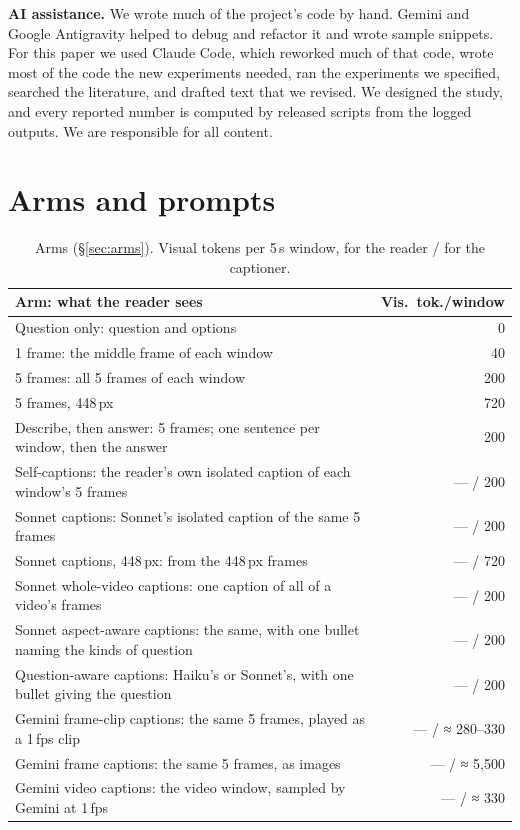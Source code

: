 \documentclass[11pt]{article}
\begin{document}
\textbf{AI assistance.} We wrote much of the project's code by hand. Gemini and Google Antigravity helped to debug and refactor it and wrote sample snippets. For this paper we used Claude Code, which reworked much of that code, wrote most of the code the new experiments needed, ran the experiments we specified, searched the literature, and drafted text that we revised. We designed the study, and every reported number is computed by released scripts from the logged outputs. We are responsible for all content.



\appendix

\section{Arms and prompts}
\label{app:prompts}

\begin{table}[t]
\centering
\footnotesize
\setlength{\tabcolsep}{3pt}
\begin{tabular}{@{}p{}r@{}}
\toprule
Arm: what the reader sees & Vis.\ tok./window \\
\midrule
Question only: question and options & 0 \\
1 frame: the middle frame of each window & 40 \\
5 frames: all 5 frames of each window & 200 \\
5 frames, 448\,px & 720 \\
Describe, then answer: 5 frames; one sentence per window, then the answer & 200 \\
\midrule
Self-captions: the reader's own isolated caption of each window's 5 frames & — / 200 \\
Sonnet captions: Sonnet's isolated caption of the same 5 frames & — / 200 \\
Sonnet captions, 448\,px: from the 448\,px frames & — / 720 \\
Sonnet whole-video captions: one caption of all of a video's frames & — / 200 \\
Sonnet aspect-aware captions: the same, with one bullet naming the kinds of question & — / 200 \\
Question-aware captions: Haiku's or Sonnet's, with one bullet giving the question & — / 200 \\
Gemini frame-clip captions: the same 5 frames, played as a 1\,fps clip & — / ≈ 280–330 \\
Gemini frame captions: the same 5 frames, as images & — / ≈ 5,500 \\
Gemini video captions: the video window, sampled by Gemini at 1\,fps & — / ≈ 330 \\
\bottomrule
\end{tabular}
\caption{Arms (\S\ref{sec:arms}). Visual tokens per 5\,s window, for the reader / for the captioner.}
\label{tab:arms}
\end{table}
\end{document}
